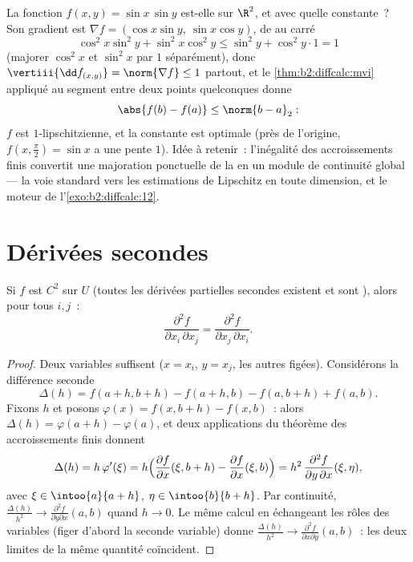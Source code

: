 \begin{example}\label{ex:b2:diffcalc:lipschitz}
La fonction $f(x, y) = \sin x\,\sin y$ est-elle  sur
$\R^2$, et avec quelle constante~? Son gradient est $\nabla f =
(\cos x\sin y,\ \sin x\cos y)$, de  au carré
\[
\cos^2x\sin^2y + \sin^2x\cos^2y
\leq \sin^2 y + \cos^2y\cdot 1 = 1
\]
(majorer $\cos^2x$ et $\sin^2x$ par $1$ séparément), donc
$\vertiii{\dd f_{(x,y)}} = \norm{\nabla f} \leq 1$ partout,
et le \cref{thm:b2:diffcalc:mvi} appliqué au segment entre deux
points quelconques donne
\[
\abs{f(b) - f(a)} \leq \norm{b - a}_2 :
\]
$f$ est $1$-lipschitzienne, et la constante est optimale (près de
l'origine, $f(x, \tfrac\pi2) = \sin x$ a une pente $1$). Idée à
retenir~: l'inégalité des accroissements finis convertit une
majoration ponctuelle de la  en un module de
continuité global --- la voie standard vers les estimations de
Lipschitz en toute dimension, et le moteur de
l'\cref{exo:b2:diffcalc:12}.
\end{example}

\section{Dérivées secondes}

\begin{theorem}[Schwarz]\label{thm:b2:diffcalc:schwarz}
Si $f$ est $C^2$ sur $U$ (toutes les dérivées partielles secondes
existent et sont ), alors pour tous $i, j$~:
\[
\frac{\partial^2 f}{\partial x_i\,\partial x_j}
= \frac{\partial^2 f}{\partial x_j\,\partial x_i} .
\]
\end{theorem}

\begin{proof}
Deux variables suffisent ($x = x_i$, $y = x_j$, les autres figées).
Considérons la différence seconde
\[
\Delta(h) = f(a + h, b + h) - f(a + h, b) - f(a, b + h) + f(a,b) .
\]
Fixons $h$ et posons $\varphi(x) = f(x, b+h) - f(x, b)$~: alors
$\Delta(h) = \varphi(a + h) - \varphi(a)$, et deux applications du
théorème des accroissements finis donnent
\[
\Delta(h) = h\,\varphi'(\xi)
= h\Bigl(\frac{\partial f}{\partial x}(\xi, b+h) -
\frac{\partial f}{\partial x}(\xi, b)\Bigr)
= h^2\,\frac{\partial^2 f}{\partial y\,\partial x}(\xi, \eta),
\]
avec $\xi \in \intoo{a}{a+h}$, $\eta \in \intoo{b}{b+h}$. Par
continuité, $\frac{\Delta(h)}{h^2} \to \frac{\partial^2 f}{\partial
y\partial x}(a, b)$ quand $h \to 0$. Le même calcul en échangeant les
rôles des variables (figer d'abord la seconde variable) donne
$\frac{\Delta(h)}{h^2} \to \frac{\partial^2 f}{\partial x
\partial y}(a,b)$~: les deux limites de la même quantité coïncident.
\end{proof}

